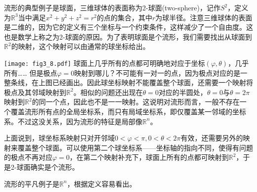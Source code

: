 流形的典型例子是球面，三维球体的表面称为2-球面(two-sphere)，记作$S^2$，定义为$\mathbb{R}^3$当中满足$x^2 + y^2 + z^2 = r^2$的点的集合，其中$r$为球半径。注意三维球体的表面是二维的，因为它的定义有三个坐标与一个约束条件，这样减少了一个自由度。这也是数学上称之为2-球面的原因。为了表明球面是个流形，我们需要找出从球面到$\mathbb{R}^2$的映射，这个映射可以由通常的球坐标给出。

{
\centering
	\captionsetup{type=figure}
    \texttt{[image: fig3\_8.pdf]}
}
球面上几乎所有的点都可明确地对应于坐标$(\varphi, \theta)$，几乎所有…… 但是极点$\varphi = 0$映射到哪儿？不可能有一对一的点，因为极点对应的是一整条线，在上图已经画出。因此球坐标映射不能覆盖整个球面，还需要一个映射将极点及其邻域映射到$\mathbb{R}^2$。相似的问题还出现在$\theta = 0$对应的半圆处，$\theta = 0$与$\theta = 2\pi$映射到$\mathbb{R}^2$的同一个点，因此也不是一一映射。这说明对流形而言，一般不存在一个覆盖流形所有点的全局坐标系，而只有局域坐标系，即仅覆盖某一邻域的坐标系。不过这没关系，因为流形的特征是局部像$\mathbb{R}^n$。

上面说到，球坐标系映射只对开邻域$0 < \varphi < \pi, 0 < \theta < 2\pi$有效，还需要另外的映射来覆盖整个球面。可以使用第二个球坐标系——坐标轴的指向不同，使得有问题的极点不再对应$\varphi = 0$，在第二个映射补充下，球面上所有的点都可映射到$\mathbb{R}^2$，于是2-球面确实是个流形。

流形的平凡例子是$\mathbb{R}^n$，根据定义容易看出。
